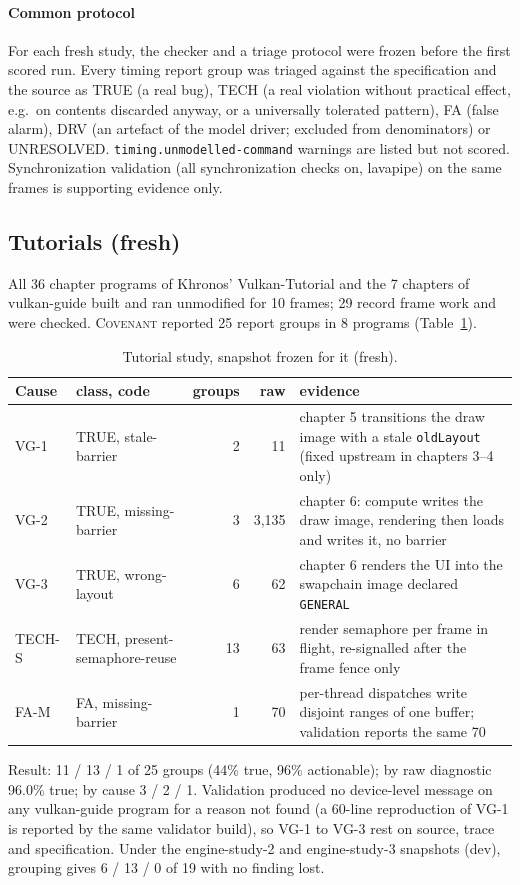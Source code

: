 \documentclass[acmtog,anonymous,review]{acmart}
\newcommand{\sys}{\textsc{Covenant}\xspace}
\newcommand{\code}[1]{\texttt{#1}}
\begin{document}
\paragraph{Common protocol}
For each fresh study, the checker and a triage protocol were frozen before the first scored run. Every timing report
group was triaged against the specification and the source as TRUE (a real bug), TECH (a real violation without
practical effect, e.g.\ on contents discarded anyway, or a universally tolerated pattern), FA (false alarm), DRV (an
artefact of the model driver; excluded from denominators) or UNRESOLVED. \code{timing.unmodelled-command} warnings are
listed but not scored. Synchronization validation (all synchronization checks on, lavapipe) on the
same frames is supporting evidence only.

\subsection{Tutorials (fresh)}
All 36 chapter programs of Khronos' Vulkan-Tutorial and the 7 chapters of vulkan-guide
built and ran unmodified for 10 frames; 29 record frame work and were checked. \sys reported 25 report
groups in 8 programs (Table~\ref{tab:s-tut}).

\begin{table}[t]
\caption{Tutorial study, snapshot frozen for it (fresh).}
\label{tab:s-tut}
\small
\begin{tabular}{@{}llrrp{}@{}}
\toprule
Cause & class, code & groups & raw & evidence \\
\midrule
VG-1 & TRUE, stale-barrier & 2 & 11 & chapter 5 transitions the draw image with a stale \code{oldLayout} (fixed upstream in chapters 3--4 only) \\
VG-2 & TRUE, missing-barrier & 3 & 3,135 & chapter 6: compute writes the draw image, rendering then loads and writes it, no barrier \\
VG-3 & TRUE, wrong-layout & 6 & 62 & chapter 6 renders the UI into the swapchain image declared \code{GENERAL} \\
TECH-S & TECH, present-semaphore-reuse & 13 & 63 & render semaphore per frame in flight, re-signalled after the frame fence only \\
FA-M & FA, missing-barrier & 1 & 70 & per-thread dispatches write disjoint ranges of one buffer; validation reports the same 70 \\
\bottomrule
\end{tabular}
\end{table}
Result: 11 / 13 / 1 of 25 groups (44\% true, 96\% actionable); by raw diagnostic 96.0\% true; by cause 3 / 2 / 1.
Validation produced no device-level message on any vulkan-guide program for a reason not found (a 60-line reproduction
of VG-1 is reported by the same validator build), so VG-1 to VG-3 rest on source, trace and specification. Under the
engine-study-2 and engine-study-3 snapshots (dev), grouping gives 6 / 13 / 0 of 19 with no finding lost.
\end{document}

